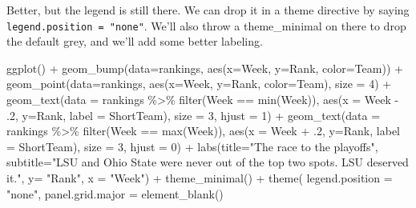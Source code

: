 \documentclass[
]{book}
\newenvironment{Shaded}{\begin{snugshade}}{\end{snugshade}}
\newcommand{\AttributeTok}[1]{\textcolor[rgb]{0.77,0.63,0.00}{#1}}
\newcommand{\DecValTok}[1]{\textcolor[rgb]{0.00,0.00,0.81}{#1}}
\newcommand{\FunctionTok}[1]{\textcolor[rgb]{0.00,0.00,0.00}{#1}}
\newcommand{\NormalTok}[1]{#1}
\newcommand{\SpecialCharTok}[1]{\textcolor[rgb]{0.00,0.00,0.00}{#1}}
\newcommand{\StringTok}[1]{\textcolor[rgb]{0.31,0.60,0.02}{#1}}
\begin{document}
Better, but the legend is still there. We can drop it in a theme directive by saying \texttt{legend.position\ =\ "none"}. We'll also throw a theme\_minimal on there to drop the default grey, and we'll add some better labeling.

\begin{Shaded}
\begin{Highlighting}[]
\FunctionTok{ggplot}\NormalTok{() }\SpecialCharTok{+} 
  \FunctionTok{geom\_bump}\NormalTok{(}\AttributeTok{data=}\NormalTok{rankings, }\FunctionTok{aes}\NormalTok{(}\AttributeTok{x=}\NormalTok{Week, }\AttributeTok{y=}\NormalTok{Rank, }\AttributeTok{color=}\NormalTok{Team)) }\SpecialCharTok{+} 
  \FunctionTok{geom\_point}\NormalTok{(}\AttributeTok{data=}\NormalTok{rankings, }\FunctionTok{aes}\NormalTok{(}\AttributeTok{x=}\NormalTok{Week, }\AttributeTok{y=}\NormalTok{Rank, }\AttributeTok{color=}\NormalTok{Team), }\AttributeTok{size =} \DecValTok{4}\NormalTok{) }\SpecialCharTok{+}   
  \FunctionTok{geom\_text}\NormalTok{(}\AttributeTok{data =}\NormalTok{ rankings }\SpecialCharTok{\%\textgreater{}\%} \FunctionTok{filter}\NormalTok{(Week }\SpecialCharTok{==} \FunctionTok{min}\NormalTok{(Week)), }\FunctionTok{aes}\NormalTok{(}\AttributeTok{x =}\NormalTok{ Week }\SpecialCharTok{{-}}\NormalTok{ .}\DecValTok{2}\NormalTok{, }\AttributeTok{y=}\NormalTok{Rank, }\AttributeTok{label =}\NormalTok{ ShortTeam), }\AttributeTok{size =} \DecValTok{3}\NormalTok{, }\AttributeTok{hjust =} \DecValTok{1}\NormalTok{) }\SpecialCharTok{+}
  \FunctionTok{geom\_text}\NormalTok{(}\AttributeTok{data =}\NormalTok{ rankings }\SpecialCharTok{\%\textgreater{}\%} \FunctionTok{filter}\NormalTok{(Week }\SpecialCharTok{==} \FunctionTok{max}\NormalTok{(Week)), }\FunctionTok{aes}\NormalTok{(}\AttributeTok{x =}\NormalTok{ Week }\SpecialCharTok{+}\NormalTok{ .}\DecValTok{2}\NormalTok{, }\AttributeTok{y=}\NormalTok{Rank, }\AttributeTok{label =}\NormalTok{ ShortTeam), }\AttributeTok{size =} \DecValTok{3}\NormalTok{, }\AttributeTok{hjust =} \DecValTok{0}\NormalTok{) }\SpecialCharTok{+}
  \FunctionTok{labs}\NormalTok{(}\AttributeTok{title=}\StringTok{"The race to the playoffs"}\NormalTok{, }\AttributeTok{subtitle=}\StringTok{"LSU and Ohio State were never out of the top two spots. LSU deserved it."}\NormalTok{, }\AttributeTok{y=} \StringTok{"Rank"}\NormalTok{, }\AttributeTok{x =} \StringTok{"Week"}\NormalTok{) }\SpecialCharTok{+}
  \FunctionTok{theme\_minimal}\NormalTok{() }\SpecialCharTok{+}
  \FunctionTok{theme}\NormalTok{(}
    \AttributeTok{legend.position =} \StringTok{"none"}\NormalTok{,}
    \AttributeTok{panel.grid.major =} \FunctionTok{element\_blank}\NormalTok{()}

\end{Highlighting}
\end{Shaded}
\end{document}
